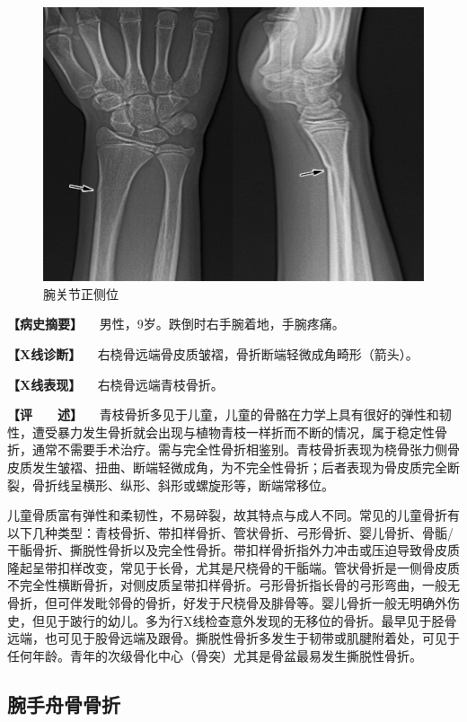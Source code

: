 \begin{figure}[!htbp]
 \centering
 \includegraphics{./images/Image00038.jpg}
 \captionsetup{justification=centering}
 \caption{腕关节正侧位}
 \label{fig2-3-11}
  \end{figure} 

\textbf{【病史摘要】} 　男性，9岁。跌倒时右手腕着地，手腕疼痛。

\textbf{【X线诊断】}
　右桡骨远端骨皮质皱褶，骨折断端轻微成角畸形（箭头）。

\textbf{【X线表现】} 　右桡骨远端青枝骨折。

\textbf{【评　　述】}
　青枝骨折多见于儿童，儿童的骨骼在力学上具有很好的弹性和韧性，遭受暴力发生骨折就会出现与植物青枝一样折而不断的情况，属于稳定性骨折，通常不需要手术治疗。需与完全性骨折相鉴别。青枝骨折表现为桡骨张力侧骨皮质发生皱褶、扭曲、断端轻微成角，为不完全性骨折；后者表现为骨皮质完全断裂，骨折线呈横形、纵形、斜形或螺旋形等，断端常移位。

儿童骨质富有弹性和柔韧性，不易碎裂，故其特点与成人不同。常见的儿童骨折有以下几种类型：青枝骨折、带扣样骨折、管状骨折、弓形骨折、婴儿骨折、骨骺/干骺骨折、撕脱性骨折以及完全性骨折。带扣样骨折指外力冲击或压迫导致骨皮质隆起呈带扣样改变，常见于长骨，尤其是尺桡骨的干骺端。管状骨折是一侧骨皮质不完全性横断骨折，对侧皮质呈带扣样骨折。弓形骨折指长骨的弓形弯曲，一般无骨折，但可伴发毗邻骨的骨折，好发于尺桡骨及腓骨等。婴儿骨折一般无明确外伤史，但见于跛行的幼儿。多为行X线检查意外发现的无移位的骨折。最早见于胫骨远端，也可见于股骨远端及跟骨。撕脱性骨折多发生于韧带或肌腱附着处，可见于任何年龄。青年的次级骨化中心（骨突）尤其是骨盆最易发生撕脱性骨折。

\subsection{腕手舟骨骨折}

